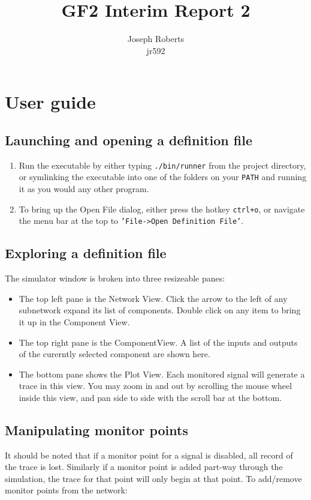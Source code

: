 \documentclass[a4paper]{article}
\author{Joseph Roberts \\
        \small{jr592}
       }
\title{GF2 Interim Report 2}
\begin{document}
\maketitle
\nocite{*}

\section{User guide}
    \subsection{Launching and opening a definition file}
        \begin{enumerate}
            \item Run the executable by either typing \texttt{./bin/runner} from the project directory, or symlinking the executable into one of the folders on your \texttt{PATH} and running it as you would any other program.
            \item To bring up the Open File dialog, either press the hotkey \texttt{ctrl+o}, or navigate the menu bar at the top to \texttt{'File->Open Definition File'}.
        \end{enumerate}

    \subsection{Exploring a definition file}
        The simulator window is broken into three resizeable panes:
        \begin{itemize}
            \item The top left pane is the Network View. Click the arrow to the left of any subnetwork expand its list of components. Double click on any item to bring it up in the Component View.
            \item The top right pane is the ComponentView. A list of the inputs and outputs of the curerntly selected component are shown here.
            \item The bottom pane shows the Plot View. Each monitored signal will generate a trace in this view. You may zoom in and out by scrolling the mouse wheel inside this view, and pan side to side with the scroll bar at the bottom.
        \end{itemize}

    \subsection{Manipulating monitor points}
        It should be noted that if a monitor point for a signal is disabled, all record of the trace is lost. Similarly if a monitor point is added part-way through the simulation, the trace for that point will only begin at that point.
        To add/remove monitor points from the network:
\end{document}
